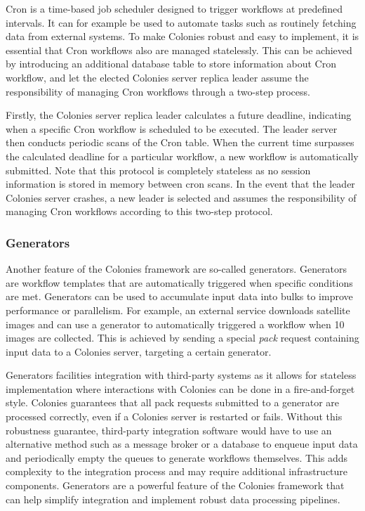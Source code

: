 \documentclass{article}
\begin{document}
Cron is a time-based job scheduler designed to trigger workflows at predefined intervals. It can for example be used to automate tasks such as routinely fetching data from external systems. To make Colonies robust and easy to implement, it is essential that Cron workflows also are managed statelessly. This can be achieved by introducing an additional database table to store information about Cron workflow, and let the elected Colonies server replica leader assume the responsibility of managing Cron workflows through a two-step process. 

Firstly, the Colonies server replica leader calculates a future deadline, indicating when a specific Cron workflow is scheduled to be executed. The leader server then conducts periodic scans of the Cron table. When the current time surpasses the calculated deadline for a particular workflow, a new workflow is automatically submitted. Note that this protocol is completely stateless as no session information is stored in memory between cron scans. In the event that the leader Colonies server crashes, a new leader is selected and assumes the responsibility of managing Cron workflows according to this two-step protocol.

\subsubsection{Generators}
Another feature of the Colonies framework are so-called generators. Generators are workflow templates that are automatically triggered when specific conditions are met. Generators can be used to accumulate input data into bulks to improve performance or parallelism. For example, an external service downloads satellite images and can use a generator to automatically triggered a workflow when 10 images are collected. This is achieved by sending a special \emph{pack} request containing input data to a Colonies server, targeting a certain generator. 

Generators facilities integration with third-party systems as it allows for stateless implementation where interactions with Colonies can be done in a fire-and-forget style. Colonies guarantees that all pack requests submitted to a generator are processed correctly, even if a Colonies server is restarted or fails. Without this robustness guarantee, third-party integration software would have to use an alternative method such as a message broker or a database to enqueue input data and periodically empty the queues to generate workflows themselves. This adds complexity to the integration process and may require additional infrastructure components. Generators are a powerful feature of the Colonies framework that can help simplify integration and implement robust data processing pipelines.
\end{document}
